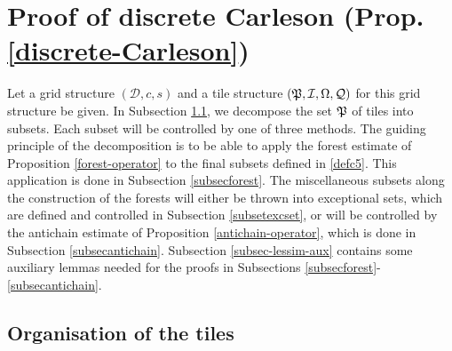 {\chapter{Proof of discrete Carleson (Prop.  \ref{discrete-Carleson}) }
\label{proptopropprop}



Let a grid structure $(\mathcal{D}, c, s)$ and a tile structure $({\mathfrak P}, {\mathcal{I}}, {\Omega}, {\mathcal{Q}})$ for this grid structure be given. In Subsection \ref{subsectilesorg}, we decompose the set ${\mathfrak P}$ of tiles into subsets. Each subset will be controlled by one of three methods. The guiding principle of the decomposition is to be able to apply the forest estimate of Proposition \ref{forest-operator} to the final subsets defined in \eqref{defc5}. This application is done in Subsection \ref{subsecforest}. The miscellaneous subsets along the construction of the forests will either be thrown into exceptional sets, which are defined and controlled in Subsection \ref{subsetexcset}, or will be controlled by the antichain estimate of Proposition \ref{antichain-operator}, which is done in Subsection \ref{subsecantichain}. Subsection \ref{subsec-lessim-aux} contains some auxiliary lemmas needed for the proofs in Subsections \ref{subsecforest}-\ref{subsecantichain}.





\section{Organisation of the tiles}\label{subsectilesorg}

}
